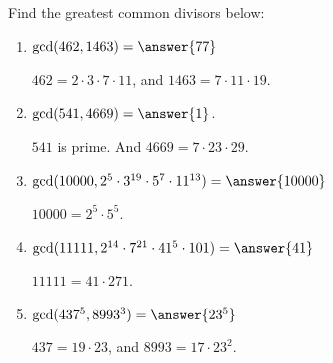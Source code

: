\documentclass[nooutcomes]{ximera}
\begin{document}
%
%
%

\begin{problem}
Find the greatest common divisors below:  
\begin{enumerate}
\item $\gcd(462,1463) = \answer{77}$  
  \begin{hint} $462 = 2\cdot 3\cdot 7\cdot 11$, and  $1463 = 7\cdot 11\cdot 19$.\end{hint}
\item $\gcd(541,4669) = \answer{1}$. 
  \begin{hint}$541$ is prime.  And $4669 = 7\cdot 23\cdot 29$.\end{hint}
\item $\gcd(10000,2^5\cdot 3^{19}\cdot 5^7\cdot 11^{13}) = \answer{10000}$
  \begin{hint}$10000 = 2^5\cdot5^5$.\end{hint}
\item $\gcd(11111,2^{14}\cdot 7^{21}\cdot 41^{5}\cdot 101) = \answer{41}$
  \begin{hint}$11111 = 41\cdot 271$.\end{hint}
\item $\gcd(437^5,8993^3) = \answer{23^5}$
  \begin{hint}$437 = 19\cdot 23$, and $8993=17\cdot 23^2$.\end{hint}
\end{enumerate}
\end{problem}
\end{document}
